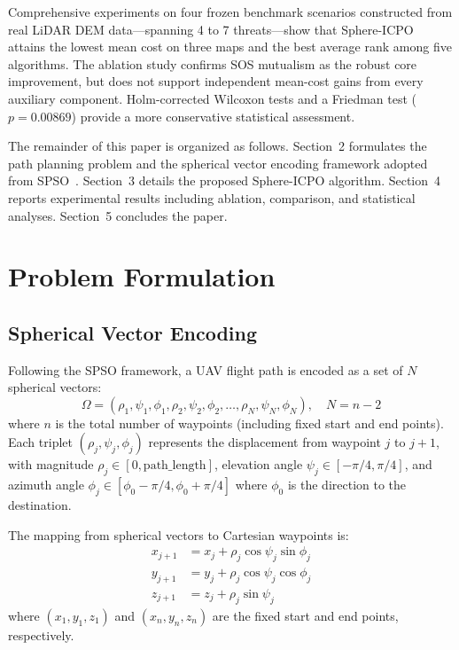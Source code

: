 \documentclass[11pt,a4paper]{article}
\begin{document}
Comprehensive experiments on four frozen benchmark scenarios constructed from real LiDAR DEM data---spanning 4 to 7 threats---show that Sphere-ICPO attains the lowest mean cost on three maps and the best average rank among five algorithms. The ablation study confirms SOS mutualism as the robust core improvement, but does not support independent mean-cost gains from every auxiliary component. Holm-corrected Wilcoxon tests and a Friedman test ($p=0.00869$) provide a more conservative statistical assessment.

The remainder of this paper is organized as follows. Section~2 formulates the path planning problem and the spherical vector encoding framework adopted from SPSO~\cite{sps2021}. Section~3 details the proposed Sphere-ICPO algorithm. Section~4 reports experimental results including ablation, comparison, and statistical analyses. Section~5 concludes the paper.

\section{Problem Formulation}

\subsection{Spherical Vector Encoding}

Following the SPSO framework, a UAV flight path is encoded as a set of $N$ spherical vectors:
\begin{equation}
    \Omega = (\rho_1, \psi_1, \phi_1, \rho_2, \psi_2, \phi_2, \ldots, \rho_N, \psi_N, \phi_N), \quad N = n - 2
\end{equation}
where $n$ is the total number of waypoints (including fixed start and end points). Each triplet $(\rho_j, \psi_j, \phi_j)$ represents the displacement from waypoint $j$ to $j+1$, with magnitude $\rho_j \in [0, \text{path\_length}]$, elevation angle $\psi_j \in [-\pi/4, \pi/4]$, and azimuth angle $\phi_j \in [\phi_0 - \pi/4, \phi_0 + \pi/4]$ where $\phi_0$ is the direction to the destination.

The mapping from spherical vectors to Cartesian waypoints is:
\begin{align}
    x_{j+1} &= x_j + \rho_j \cos\psi_j \sin\phi_j \label{eq:cartx} \\
    y_{j+1} &= y_j + \rho_j \cos\psi_j \cos\phi_j \label{eq:carty} \\
    z_{j+1} &= z_j + \rho_j \sin\psi_j \label{eq:cartz}
\end{align}
where $(x_1, y_1, z_1)$ and $(x_n, y_n, z_n)$ are the fixed start and end points, respectively.
\end{document}
